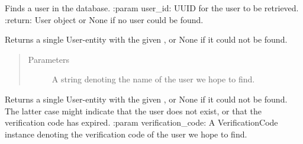 \documentclass[letterpaper,10pt,english]{sphinxmanual}
\begin{document}

\begin{fulllineitems}
\label{\detokenize{pydash_app.user.repository:pydash_app.user.repository.find}}
Finds a user in the database.
:param user\_id: UUID for the user to be retrieved.
:return: User object or None if no user could be found.

\end{fulllineitems}


\begin{fulllineitems}
\label{\detokenize{pydash_app.user.repository:pydash_app.user.repository.find_by_name}}
Returns a single User-entity with the given , or None if it could not be found.
\begin{quote}\begin{description}
\item[{Parameters}] \leavevmode
{} \textendash{} A string denoting the name of the user we hope to find.

\end{description}\end{quote}

\end{fulllineitems}


\begin{fulllineitems}
\label{\detokenize{pydash_app.user.repository:pydash_app.user.repository.find_by_verification_code}}
Returns a single User-entity with the given , or None if it could not be found.
The latter case might indicate that the user does not exist, or that the verification code has expired.
:param verification\_code: A VerificationCode instance denoting the verification code of the user we hope to find.

\end{fulllineitems}
\end{document}
